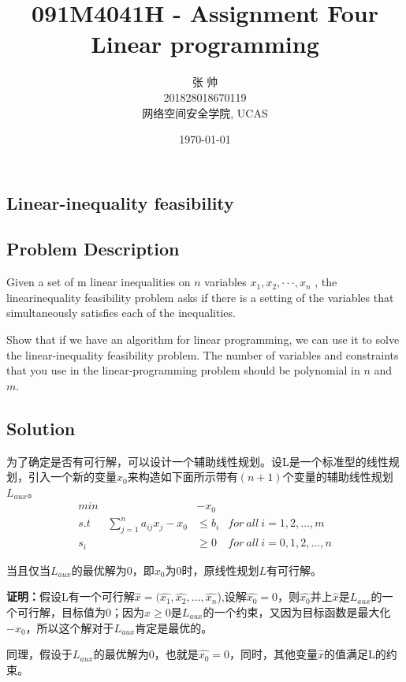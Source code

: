 \documentclass[UTF8,a4paper,12pt]{article}
\title{091M4041H - Assignment Four\\Linear programming}
\date{\today}
\author{张   帅\\201828018670119\\网络空间安全学院, UCAS}
\begin{document}
	\begin{CJK}{UTF8}{gkai}
		\maketitle
		
	\newpage
	\section{Linear-inequality feasibility}
	\subsection{Problem Description}
		Given a set of m linear inequalities on $ n $ variables $  x_1 , x_2 , · · · , x_n $ , the linearinequality feasibility problem asks if there is a setting of the variables that simultaneously satisfies each of the inequalities.
	
		Show that if we have an algorithm for linear programming, we can use it to solve the linear-inequality feasibility problem. The number of variables and constraints that you use in the linear-programming problem should be polynomial in $ n $ and $ m $.
	\subsection{Solution}	
			
		
		为了确定是否有可行解，可以设计一个辅助线性规划。设L是一个标准型的线性规划，引入一个新的变量$ x_0 $来构造如下面所示带有$ (n+1) $个变量的辅助线性规划$ L_{aux} $。	
		\begin{align*}
			min\ \ \ \ \ \ \  \ \ \ \  \ \ \ \  & -x_0\\ 
			s.t\ \ \ \ \ \ \  \sum_{j=1}^{n}a_{ij}x_j - x_0 &\le b_i&for\ all\ i=1,2,\dots,m \\
			s_{i} &\ge 0 &for\ all\ i=0,1,2,\dots,n
		\end{align*}
		
		当且仅当$ L_{aux} $的最优解为0，即$ x_0 $为0时，原线性规划$ L $有可行解。
		
		\textbf{证明：}假设L有一个可行解$ \hat{x} = (\hat{x_{1}},\hat{x_{2}},\dots,\hat{x_{n}} $),设解$ \hat{x_0}=0 $，则$ \hat{x_0} $并上$ \hat{x} $是$ L_{aux} $的一个可行解，目标值为0；因为$ \hat{x}\ge0 $是$ L_{aux} $的一个约束，又因为目标函数是最大化$ -x_0 $，所以这个解对于$ L_{aux} $肯定是最优的。
			
			同理，假设于$ L_{aux} $的最优解为0，也就是$\hat{x_0}=0 $，同时，其他变量$ \hat{x}$的值满足L的约束。
			

\end{CJK}
\end{document}
